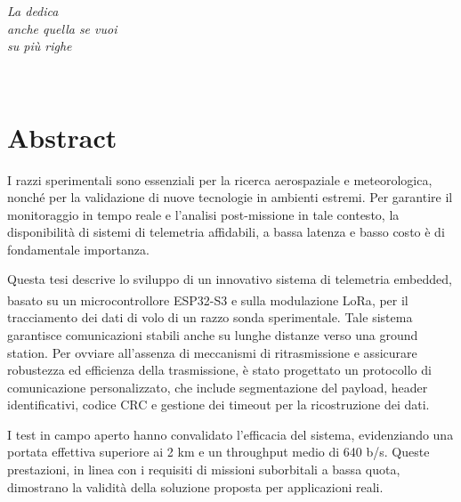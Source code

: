 \documentclass[12pt,a4paper,twoside]{book}
\begin{document}

\ifdefined\HCode
\else
    \topmargin=5.5cm
    \begin{flushright}
        \emph{
            \LARGE{La dedica}\\\vspace{3mm}
            \LARGE{anche quella se vuoi}\\\vspace{3mm}
            \LARGE{su più righe}
        }
    \end{flushright}
\fi
\newpage~\newpage
{}
\chapter*{Abstract}
I razzi sperimentali sono essenziali per la ricerca aerospaziale e meteorologica, 
nonché per la validazione di nuove tecnologie in ambienti estremi. 
Per garantire il monitoraggio in tempo reale e l'analisi post-missione in tale 
contesto, la disponibilità di sistemi di telemetria affidabili, a bassa latenza 
e basso costo è di fondamentale importanza.

Questa tesi descrive lo sviluppo di un innovativo sistema di telemetria embedded, 
basato su un microcontrollore ESP32-S3 e sulla modulazione LoRa\textsuperscript{\textcopyright}, 
per il tracciamento dei dati di volo di un razzo sonda sperimentale. Tale sistema 
garantisce comunicazioni stabili anche su lunghe distanze verso una ground station. 
Per ovviare all'assenza di meccanismi di ritrasmissione e assicurare robustezza 
ed efficienza della trasmissione, è stato progettato un protocollo di comunicazione 
personalizzato, che include segmentazione del payload, header identificativi, 
codice CRC e gestione dei timeout per la ricostruzione dei dati.

I test in campo aperto hanno convalidato l'efficacia del sistema, evidenziando una 
portata effettiva superiore ai 2 km e un throughput medio di 640 b/s. Queste 
prestazioni, in linea con i requisiti di missioni suborbitali a bassa quota, 
dimostrano la validità della soluzione proposta per applicazioni reali.
\end{document}
